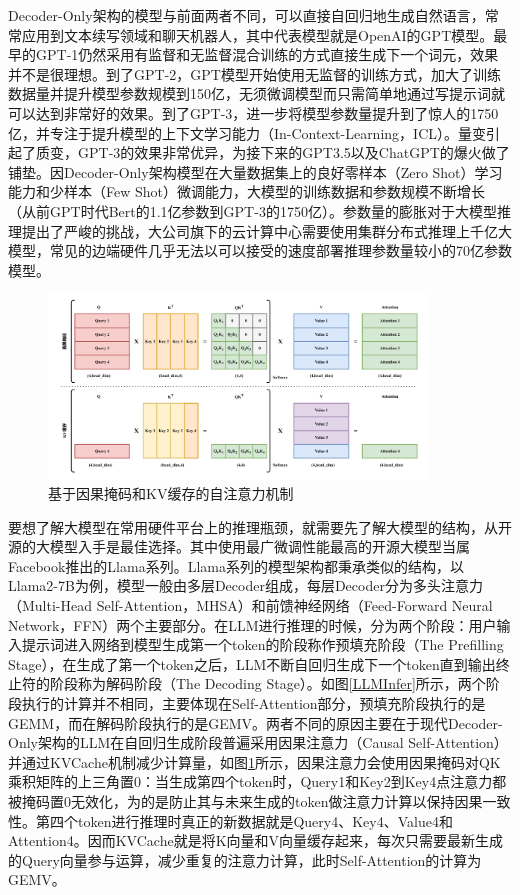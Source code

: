 Decoder-Only架构的模型与前面两者不同，可以直接自回归地生成自然语言，常常应用到文本续写领域和聊天机器人，其中代表模型就是OpenAI的GPT模型。最早的GPT-1\cite{GPT-1}仍然采用有监督和无监督混合训练的方式直接生成下一个词元，效果并不是很理想。到了GPT-2\cite{GPT-2}，GPT模型开始使用无监督的训练方式，加大了训练数据量并提升模型参数规模到150亿，无须微调模型而只需简单地通过写提示词就可以达到非常好的效果。到了GPT-3\cite{GPT-3}，进一步将模型参数量提升到了惊人的1750亿，并专注于提升模型的上下文学习能力（In-Context-Learning，ICL）。量变引起了质变，GPT-3的效果非常优异，为接下来的GPT3.5以及ChatGPT的爆火做了铺垫。因Decoder-Only架构模型在大量数据集上的良好零样本（Zero Shot）学习能力\cite{Zero-Shot}和少样本（Few Shot）微调能力\cite{Few-Shot}，大模型的训练数据和参数规模不断增长（从前GPT时代Bert的1.1亿参数到GPT-3的1750亿）。参数量的膨胀对于大模型推理提出了严峻的挑战，大公司旗下的云计算中心需要使用集群分布式推理上千亿大模型，常见的边端硬件几乎无法以可以接受的速度部署推理参数量较小的70亿参数模型。

\begin{figure}[!htbp]
	\centering
    \includegraphics[width=0.9\textwidth]{figures/KVCache.pdf}
    \caption{基于因果掩码和KV缓存的自注意力机制}
	\label{KVCache}
\end{figure}

要想了解大模型在常用硬件平台上的推理瓶颈，就需要先了解大模型的结构，从开源的大模型入手是最佳选择。其中使用最广微调性能最高的开源大模型当属Facebook推出的Llama系列。Llama系列的模型架构都秉承类似的结构，以Llama2-7B\cite{Llama2}为例，模型一般由多层Decoder组成，每层Decoder分为多头注意力（Multi-Head Self-Attention，MHSA）和前馈神经网络（Feed-Forward Neural Network，FFN）两个主要部分。在LLM进行推理的时候，分为两个阶段：用户输入提示词进入网络到模型生成第一个token的阶段称作预填充阶段（The Prefilling Stage），在生成了第一个token之后，LLM不断自回归生成下一个token直到输出终止符的阶段称为解码阶段（The Decoding Stage）。如图\ref{LLMInfer}所示，两个阶段执行的计算并不相同，主要体现在Self-Attention部分，预填充阶段执行的是GEMM，而在解码阶段执行的是GEMV。两者不同的原因主要在于现代Decoder-Only架构的LLM在自回归生成阶段普遍采用因果注意力（Causal Self-Attention）并通过KVCache机制减少计算量，如图\ref{KVCache}所示，因果注意力会使用因果掩码对QK乘积矩阵的上三角置0：当生成第四个token时，Query1和Key2到Key4点注意力都被掩码置0无效化，为的是防止其与未来生成的token做注意力计算以保持因果一致性。第四个token进行推理时真正的新数据就是Query4、Key4、Value4和Attention4。因而KVCache就是将K向量和V向量缓存起来，每次只需要最新生成的Query向量参与运算，减少重复的注意力计算，此时Self-Attention的计算为GEMV。


